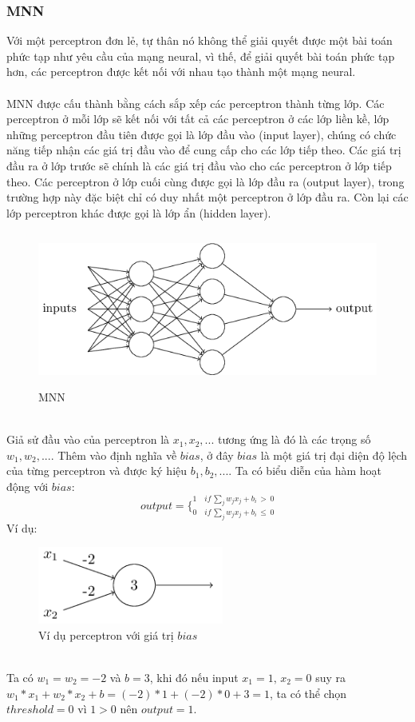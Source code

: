 \subsubsection{MNN}
Với một perceptron đơn lẻ, tự thân nó không thể giải quyết được một bài toán 
phức tạp như yêu cầu của mạng neural, vì thế, để giải quyết bài toán phức tạp 
hơn, các perceptron được kết nối với nhau tạo thành một mạng neural.\\\\
MNN được cấu thành bằng cách sắp xếp các perceptron thành 
từng lớp. Các perceptron ở mỗi lớp sẽ kết nối với tất cả các perceptron ở các 
lớp liền kề, lớp những perceptron đầu tiên được gọi là lớp đầu vào (input layer), 
chúng có chức năng tiếp nhận các giá trị đầu vào để cung cấp cho các lớp tiếp 
theo. Các giá trị đầu ra ở lớp trước sẽ chính là các giá trị đầu vào cho 
các perceptron ở lớp tiếp theo. Các perceptron ở lớp cuối cùng được gọi là lớp 
đầu ra (output layer), trong trường hợp này đặc biệt chỉ có duy nhất một 
perceptron ở lớp đầu ra. Còn lại các lớp perceptron khác được gọi là lớp ẩn 
(hidden layer).\\
\begin{figure}[h!]
\centering
\includegraphics[height=2in, keepaspectratio=true]{multilayerneuralnetwork.png}
\caption{MNN}
\end{figure}\\
Giả sử đầu vào của perceptron là $x_1, x_2, ...$ tương ứng là đó là các trọng 
số $w_1, w_2, ...$. Thêm vào định nghĩa về $bias$, ở đây $bias$ là một giá trị 
đại diện độ lệch của từng perceptron và được ký hiệu $b_1, b_2, ...$. Ta có 
biểu diễn của hàm hoạt động với $bias$:
\[
  output = 
  \bigg\{
    _{0 \quad if \, \sum_j w_j x_j + b_i\, \leq \, 0}
    ^{1 \quad if \, \sum_j w_j x_j + b_i\, > \, 0}
\]
Ví dụ:
\begin{figure}[h!]
\centering
\includegraphics[height=1in, keepaspectratio=true]{exmln.png}
\caption{Ví dụ perceptron với giá trị $bias$}
\end{figure}\\
Ta có $w_1=w_2=-2$ và $b=3$, khi đó nếu input $x_1=1,\, x_2=0$ suy ra $ 
w_1*x_1+w_2*x_2+b=(-2)*1+(-2)*0+3=1$, ta có thể chọn $threshold=0$ vì $1>0$
nên $output=1$.
